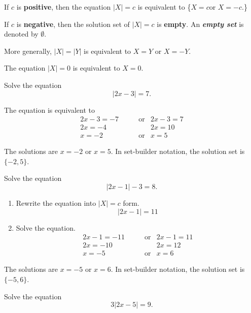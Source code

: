 \documentclass[en,12pt]{elegantbook}
\let\BeginKnitrBlock\begin \let\EndKnitrBlock\end
\begin{document}
If \(c\) is \textbf{positive}, then the equation \(|X|=c\) is equivalent to \{\(X=c\)\quad or \quad \(X=-c\).\}

If \(c\) is \textbf{negative}, then the solution set of \(|X|=c\) is \textbf{empty}.
An \textbf{\emph{empty set}} is denoted by \(\emptyset\).

More generally, \(|X|=|Y|\) is equivalent to \(X=Y\) or \(X=-Y\).

The equation \(|X|=0\) is equivalent to \(X=0\).

\BeginKnitrBlock{example}
\protect\hypertarget{exm:unnamed-chunk-174}{}{\label{exm:unnamed-chunk-174} }
Solve the equation
\[|2x-3|=7.\]
\EndKnitrBlock{example}

\BeginKnitrBlock{solution}


The equation is equivalent to
\[
\begin{aligned}
    2x-3  =-7   & \qquad\text{or} & 2x-3  =7  \\
    2x    =-4   &          & 2x    =10 \\
    x     =-2   & \qquad\text{or} & x     =5
\end{aligned}
\]

The solutions are \(x=-2\) or \(x=5\). In set-builder notation, the solution set is \(\{-2, 5\}\).
\EndKnitrBlock{solution}

\BeginKnitrBlock{example}
\protect\hypertarget{exm:unnamed-chunk-176}{}{\label{exm:unnamed-chunk-176} }
Solve the equation
\[|2x-1|-3=8.\]
\EndKnitrBlock{example}

\BeginKnitrBlock{solution}


\begin{enumerate}
\def\labelenumi{\arabic{enumi}.}
\item
  Rewrite the equation into \(|X|=c\) form.
  \[|2x-1|=11\]
\item
  Solve the equation.
  \[
   \begin{aligned}
       2x-1  =-11   & \qquad\text{or} & 2x-1  =11 \\
       2x    =-10   &          & 2x    =12 \\
       x     =-5    & \qquad\text{or} & x     =6
   \end{aligned}
   \]
\end{enumerate}

The solutions are \(x=-5\) or \(x=6\). In set-builder notation, the solution set is \(\{-5, 6\}\).
\EndKnitrBlock{solution}

\BeginKnitrBlock{example}
\protect\hypertarget{exm:unnamed-chunk-178}{}{\label{exm:unnamed-chunk-178} }
Solve the equation
\[3|2x-5|=9.\]
\EndKnitrBlock{example}
\end{document}
